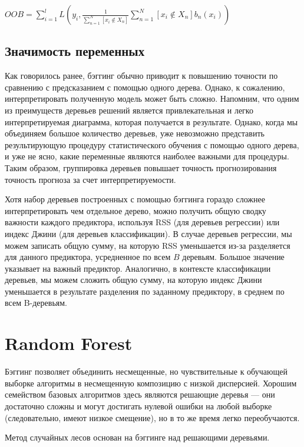 \documentclass{article}
\begin{document}
$OOB = \sum_{i=1}^{l}L\left(y_i,\frac{1}{\sum_{n=1}^{N}\left[x_i \notin X_n\right]}\sum_{n=1}^{N}[x_i\notin X_n]b_n(x_i)\right)$

\subsection{Значимость переменных}

Как говорилось ранее, бэггинг обычно приводит к повышению точности по сравнению с предсказанием с помощью одного дерева. Однако, к сожалению, интерпретировать полученную модель может быть сложно. Напомним, что одним из преимуществ деревьев решений является привлекательная и легко интерпретируемая диаграмма, которая получается в результате. Однако, когда мы объединяем большое количество деревьев, уже невозможно представить результирующую процедуру статистического обучения с помощью одного дерева, и уже не ясно, какие переменные являются наиболее важными для процедуры. Таким образом, группировка деревьев повышает точность прогнозирования точность прогноза за счет интерпретируемости. 

Хотя набор деревьев построенных с помощью бэггинга гораздо сложнее интерпретировать чем отдельное дерево, можно получить общую сводку важности каждого предиктора, используя RSS (для деревьев регрессии) или индекс Джини (для деревьев классификации). В случае  деревьев регрессии, мы можем записать общую сумму, на которую RSS уменьшается из-за разделяется для данного предиктора, усредненное по всем $B$ деревьям. Большое значение указывает на важный предиктор. Аналогично, в контексте  классификации деревьев, мы можем сложить общую сумму, на которую индекс Джини  уменьшается в результате разделения по заданному предиктору, в среднем по всем B-деревьям.


\section{Random Forest}

Бэггинг позволяет объединить несмещенные, но чувствительные к обучающей выборке алгоритмы в несмещенную композицию с низкой дисперсией. Хорошим семейством базовых алгоритмов здесь являются решающие деревья --- они достаточно сложны и могут достигать нулевой ошибки на любой выборке (следовательно, имеют низкое смещение), но в то же время легко переобучаются.

Метод случайных лесов основан на бэггинге над решающими деревьями.
\end{document}
